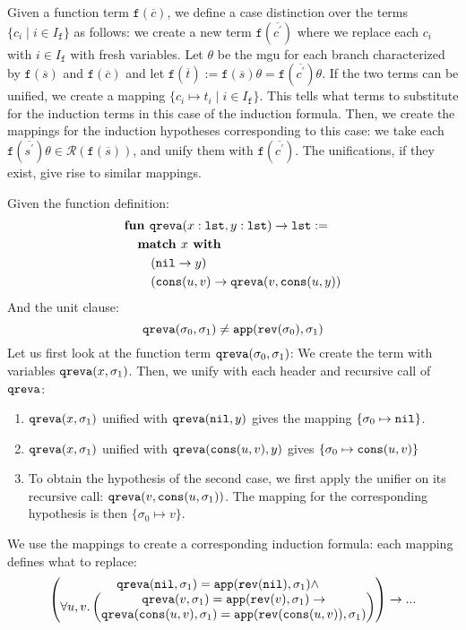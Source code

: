 Given a function term $\mathtt{f}(\overline{c})$, we define a case distinction over the terms $\{c_i\mid i\in I_\mathtt{f}\}$ as follows: we create a new term $\mathtt{f}(\overline{c^\prime})$ where we replace each $c_i$ with $i\in I_\mathtt{f}$ with fresh variables. Let $\theta$ be the mgu for each branch characterized by $\mathtt{f}(\overline{s})$ and $\mathtt{f}(\overline{c})$ and let $\mathtt{f}(\overline{t}):=\mathtt{f}(\overline{s})\theta=\mathtt{f}(\overline{c^\prime})\theta$. If the two terms can be unified, we create a mapping $\{c_i\mapsto t_i\mid i\in I_\mathtt{f}\}$. This tells what terms to substitute for the induction terms in this case of the induction formula. Then, we create the mappings for the induction hypotheses corresponding to this case: we take each $\mathtt{f}(\overline{s^\prime})\theta\in\mathcal{R}(\mathtt{f}(\overline{s}))$, and unify them with $\mathtt{f}(\overline{c^\prime})$. The unifications, if they exist, give rise to similar mappings.

\begin{example}\label{ex:3}
	Given the function definition:
	\begin{equation}
	\begin{aligned}
	\nonumber
	&\textbf{fun } \qreva (x : \lst, y : \lst) \rightarrow \lst :=\\
	&\tab\textbf{match } x \textbf{ with}\\
	&\tab\tab(\nil\rightarrow y)\\ &\tab\tab(\cons(u,v)\rightarrow\qreva(v,\cons(u,y))\end{aligned}\end{equation}
	And the unit clause:
	$$\mathtt{qreva}(\sigma_0,\sigma_1)\neq\mathtt{app}(\mathtt{rev}(\sigma_0),\sigma_1)$$
	Let us first look at the function term $\mathtt{qreva}(\sigma_0,\sigma_1)$:
	We create the term with variables $\mathtt{qreva}(x,\sigma_1)$. Then, we unify with each
	header and recursive call of $\mathtt{qreva}$:
	\begin{enumerate}
		\item $\mathtt{qreva}(x,\sigma_1)$ unified with $\mathtt{qreva}(\mathtt{nil},y)$ gives the mapping $\{\sigma_0\mapsto\mathtt{nil}\}$.
		\item $\mathtt{qreva}(x,\sigma_1)$ unified with $\mathtt{qreva}(\mathtt{cons}(u,v),y)$ gives $\{\sigma_0\mapsto\mathtt{cons}(u,v)\}$
		\item To obtain the hypothesis of the second case, we first apply the unifier on its recursive call: $\mathtt{qreva}(v, \mathtt{cons}(u,\sigma_1))$. The mapping for the corresponding hypothesis is then $\{\sigma_0\mapsto v\}$.
	\end{enumerate}
	We use the mappings to create a corresponding induction formula: each mapping defines what to replace:
	$$\begin{pmatrix}
	\mathtt{qreva}(\mathtt{nil},\sigma_1)=\mathtt{app}(\mathtt{rev}(\mathtt{nil}),\sigma_1)\land\\
	\forall u,v.\begin{pmatrix}\mathtt{qreva}(v,\sigma_1)=\mathtt{app}(\mathtt{rev}(v),\sigma_1)\rightarrow\\
	\mathtt{qreva}(\mathtt{cons}(u,v),\sigma_1)=\mathtt{app}(\mathtt{rev}(\mathtt{cons}(u,v)),\sigma_1)\end{pmatrix}
	\end{pmatrix}\rightarrow...$$
\end{example}

